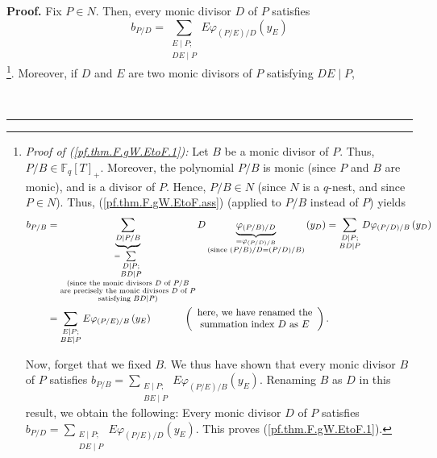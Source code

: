 \documentclass[numbers=enddot,12pt,final,onecolumn,notitlepage]{scrartcl}%
\theoremstyle{definition}
\newenvironment{proof}[1][Proof]{\noindent\textbf{#1.} }{\ \rule{0.5em}{0.5em}}
\let\sumnonlimits\sum
\renewcommand{\sum}{\sumnonlimits\limits}
\begin{document}
\begin{proof}
Fix $P\in N$. Then, every monic divisor $D$ of $P$ satisfies%
\begin{equation}
b_{P/D}=\sum_{\substack{E\mid P;\\DE\mid P}}E\varphi_{\left(  P/E\right)
/D}\left(  y_{E}\right)  \label{pf.thm.F.gW.EtoF.1}%
\end{equation}
\footnote{\textit{Proof of (\ref{pf.thm.F.gW.EtoF.1}):} Let $B$ be a monic
divisor of $P$. Thus, $P/B\in\mathbb{F}_{q}\left[  T\right]  _{+}$. Moreover,
the polynomial $P/B$ is monic (since $P$ and $B$ are monic), and is a divisor
of $P$. Hence, $P/B\in N$ (since $N$ is a $q$-nest, and since $P\in N$). Thus,
(\ref{pf.thm.F.gW.EtoF.ass}) (applied to $P/B$ instead of $P$) yields%
\begin{align*}
b_{P/B}  &  =\underbrace{\sum_{D\mid P/B}}_{\substack{=\sum_{\substack{D\mid
P;\\BD\mid P}}\\\text{(since the monic divisors }D\text{ of }P/B\\\text{are
precisely the monic divisors }D\text{ of }P\\\text{satisfying }BD\mid
P\text{)}}}D\underbrace{\varphi_{\left(  P/B\right)  /D}}_{\substack{=\varphi
_{\left(  P/D\right)  /B}\\\text{(since }\left(  P/B\right)  /D=\left(
P/D\right)  /B\text{)}}}\left(  y_{D}\right)  =\sum_{\substack{D\mid
P;\\BD\mid P}}D\varphi_{\left(  P/D\right)  /B}\left(  y_{D}\right) \\
&  =\sum_{\substack{E\mid P;\\BE\mid P}}E\varphi_{\left(  P/E\right)
/B}\left(  y_{E}\right)  \ \ \ \ \ \ \ \ \ \ \left(
\begin{array}
[c]{c}%
\text{here, we have renamed the}\\
\text{summation index }D\text{ as }E
\end{array}
\right)  .
\end{align*}
\par
Now, forget that we fixed $B$. We thus have shown that every monic divisor $B$
of $P$ satisfies $b_{P/B}=\sum_{\substack{E\mid P;\\BE\mid P}}E\varphi
_{\left(  P/E\right)  /B}\left(  y_{E}\right)  $. Renaming $B$ as $D$ in this
result, we obtain the following: Every monic divisor $D$ of $P$ satisfies
$b_{P/D}=\sum_{\substack{E\mid P;\\DE\mid P}}E\varphi_{\left(  P/E\right)
/D}\left(  y_{E}\right)  $. This proves (\ref{pf.thm.F.gW.EtoF.1}).}.
Moreover, if $D$ and $E$ are two monic divisors of $P$ satisfying $DE\mid P$,

\end{proof}
\end{document}
